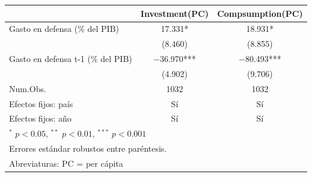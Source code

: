 \begin{tabular}[t]{lcc}
\toprule
  & Investment(PC) & Compsumption(PC)\\
\midrule
Gasto en defensa (\% del PIB) & \num{17.331}* & \num{18.931}*\\
 & (\num{8.460}) & (\num{8.855})\\
Gasto en defensa t-1 (\% del PIB) & \num{-36.970}*** & \num{-80.493}***\\
 & (\num{4.902}) & (\num{9.706})\\
\midrule
Num.Obs. & \num{1032} & \num{1032}\\
Efectos fijos: país & Sí & Sí\\
Efectos fijos: año & Sí & Sí\\
\bottomrule
\multicolumn{3}{l}{\rule{0pt}{1em}{\scriptsize $^{*}$ $p<0.05$, $^{**}$ $p<0.01$, $^{***}$ $p<0.001$}}\\[-1.1em]
\multicolumn{3}{l}{\rule{0pt}{1em}{\scriptsize Errores estándar robustos entre paréntesis.}}\\[-1.1em]
\multicolumn{3}{l}{\rule{0pt}{1em}{\scriptsize Abreviaturas: PC = per cápita}}\\[-1.1em]
\end{tabular}
